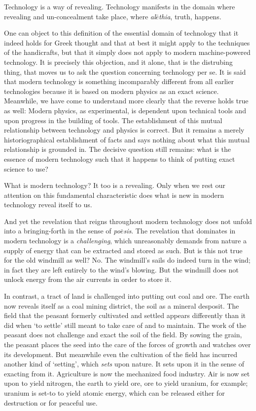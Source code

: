 \documentclass[paper=a4, fontsize=11pt,twoside]{scrartcl}
\begin{document}
Technology is a way of revealing. Technology manifests in the domain where revealing and un-concealment take place, where \textit{al$\bar{e}$thia}, truth, happens.

One can object to this definition of the essential domain of technology that it indeed holds for Greek thought and that at best it might apply to the techniques of the handicrafts, but that it simply does not apply to modern machine-powered technology. It is precisely this objection, and it alone, that is the distrubing thing, that moves us to ask the question concerning technology per se. It is said that modern technology is something incomparably different from all earlier technologies because it is based on modern physics as an exact science. Meanwhile, we have come to understand more clearly that the reverse holds true as well: Modern physics, as experimental, is dependent upon technical tools and upon progress in the building of tools. The establishment of this mutual relationship between technology and physics is correct. But it remains a merely historiographical establishment of facts and says nothing about what this mutual relationship is grounded in. The decisive question still remains: what is the essence of modern technology such that it happens to think of putting exact science to use?

What is modern technology? It too is a revealing. Only when we rest our attention on this fundamental characteristic does what is new in modern technology reveal itself to us. 

And yet the revelation that reigns throughout modern technology does not unfold into a bringing-forth in the sense of \textit{po$\bar{e}$sis}. The revelation that dominates in modern technology is a \textit{challenging}, which unreasonably demands from nature a supply of energy that can be extracted and stored as such. But is this not true for the old windmill as well? No. The windmill's sails do indeed turn in the wind; in fact they are left entirely to the wind's blowing. But the windmill does not unlock energy from the air currents in order to store it.

In contrast, a tract of land is challenged into putting out coal and ore. The earth now reveals itself as a coal mining district, the soil as a mineral desposit. The field that the peasant formerly cultivated and settled appears differently than it did when `to settle' still meant to take care of and to maintain. The work of the peasant does not challenge and exact the soil of the field. By sowing the grain, the peasant places the seed into the care of the forces of growth and watches over its development. But meanwhile even the cultivation of the field has incurred another kind of `setting', which \textit{sets} upon nature. It sets upon it in the sense of exacting from it. Agriculture is now the mechanized food industry. Air is now set upon to yield nitrogen, the earth to yield ore, ore to yield uranium, for example; uranium is set-to to yield atomic energy, which can be released either for destruction or for peaceful use.
\end{document}
